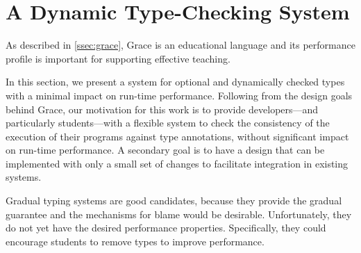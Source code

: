 
\section{A Dynamic Type-Checking System}
\label{sec:method}




As described in \cref{ssec:grace},
Grace is an educational language and its performance profile
is important for supporting effective teaching. 

In this section,
we present a system for optional and dynamically checked types
with a minimal impact on run-time performance.
Following from the design goals behind Grace,
our motivation for this work
is to provide developers---and particularly students---with a flexible system 
to check the consistency of the execution of their programs
against type annotations,
without significant impact on run-time performance.
A secondary goal is to have a design that can be implemented with
only a small set of changes to facilitate integration in existing systems.

{Gradual typing systems are good candidates,
because they provide the gradual guarantee and the mechanisms for blame
would be desirable.}
Unfortunately, they do not yet have the desired performance properties\citep{Takikawa2016,Vitousek2017,Muehlboeck2017,Bauman2017,Richards2017,Greenman2018}.
Specifically, they could encourage students to remove types
to improve performance.

